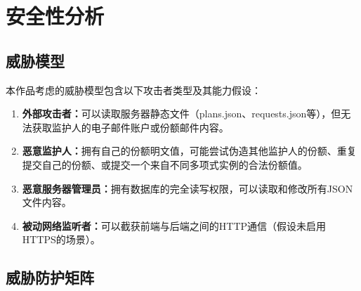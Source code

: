 \documentclass[UTF8,a4paper,zihao=-4,openany]{ctexrep}
\begin{document}
\section{安全性分析}

\subsection{威胁模型}

本作品考虑的威胁模型包含以下攻击者类型及其能力假设：

\begin{enumerate}
  \item \textbf{外部攻击者：}可以读取服务器静态文件（plans.json、requests.json等），但无法获取监护人的电子邮件账户或份额邮件内容。
  \item \textbf{恶意监护人：}拥有自己的份额明文值，可能尝试伪造其他监护人的份额、重复提交自己的份额、或提交一个来自不同多项式实例的合法份额值。
  \item \textbf{恶意服务器管理员：}拥有数据库的完全读写权限，可以读取和修改所有JSON文件内容。
  \item \textbf{被动网络监听者：}可以截获前端与后端之间的HTTP通信（假设未启用HTTPS的场景）。
\end{enumerate}

\subsection{威胁防护矩阵}
\end{document}
